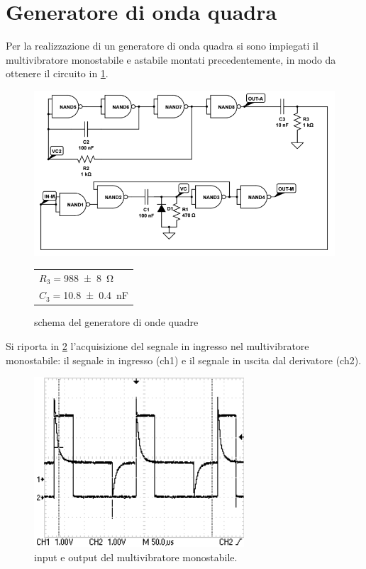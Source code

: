 
\section{Generatore di onda quadra}
	Per la realizzazione di un generatore di onda quadra si sono impiegati il multivibratore monostabile e astabile montati precedentemente, in modo da ottenere il circuito in \figurename{ \ref{f:qadra}}.
	
	\begin{figure}[H]
		\begin{minipage}{0.75\textwidth}
		\centering
		\includegraphics[scale=0.6]{../Figs-Tabs/qadra.png}
		\caption{schema del generatore di onde quadre}
		\label{f:qadra}
		\end{minipage}
		\begin{minipage}{0.14\textwidth}
			\begin{tabular}{l}
		$R_{3}=$\SI{988 \pm 8}{\ohm}\\
		$C_{3}=$\SI{10.8 \pm 0.4 }{\nano \farad}
			\end{tabular}
		\end{minipage}
	\end{figure}
	
	Si riporta in \figurename{ \ref{f:osci-qad}} l'acquisizione del segnale in 
	ingresso nel multivibratore monostabile: il segnale in ingresso (ch1) e il segnale in uscita dal derivatore (ch2).
	
	\begin{figure}[H]
		\centering
		\includegraphics[scale=1.0]{../Figs-Tabs/deth_generator.png}
		\caption{input e output del multivibratore monostabile.}
		\label{f:osci-qad}
	\end{figure}
	
